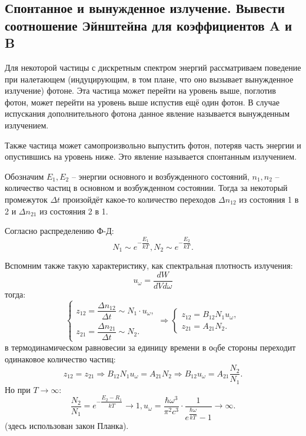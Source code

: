 \subsection{Спонтанное и вынужденное излучение. Вывести соотношение Эйнштейна для
коэффициентов A и B}\label{einstein-a-b}

Для некоторой частицы с дискретным спектром энергий рассматриваем поведение при налетающем
(индуцирующим, в том плане, что оно вызывает вынужденное излучение) фотоне. Эта частица может
перейти на уровень выше, поглотив фотон, может перейти на уровень выше испустив ещё один фотон.
В случае испускания дополнительного фотона данное явление называется вынужденным излучением.

Также частица может самопроизвольно выпустить фотон, потеряв часть энергии и опустившись на
уровень ниже. Это явление называется спонтанным излучением.

Обозначим $E_1, E_2$ -- энергии основного и возбужденного состояний, $n_1, n_2$ -- количество
частиц в основном и возбужденном состоянии. Тогда за некоторый промежуток $\Delta t$ произойдёт
какое-то количество переходов $\Delta n_{12}$ из состояния 1 в 2 и $\Delta n_{21}$ из
состояния 2 в 1.

Согласно распределению Ф-Д:
\[
  N_1 \sim e^{-\dfrac{E_1}{kT}}, N_2 \sim e^{-\dfrac{E_2}{kT}}.
\]

Вспомним также такую характеристику, как спектральная плотность излучения:
\[
  u_\omega = \dfrac{dW}{dV d\omega}
\]
тогда:
\[
  \begin{cases}
    z_{12} = \dfrac{\Delta n_{12}}{\Delta t} \sim N_1 \cdot u_\omega, \\[10pt]
    z_{21} = \dfrac{\Delta n_{21}}{\Delta t} \sim N_2. 
  \end{cases}
  \Rightarrow
  \begin{cases}
    z_{12} = B_{12} N_1 u_\omega, \\
    z_{21} = A_{21} N_2.
  \end{cases}
\]
в термодинамическом равновесии за единицу времени в оqбе стороны переходит одинаковое количество 
частиц:
\[
  z_{12} = z_{21} \Rightarrow
  B_{12} N_1 u_\omega = A_{21} N_2
  \Rightarrow
  B_{12} u_\omega = A_{21} \dfrac{N_2}{N_1}.
\]
Но при $T \to \infty$:
\[
  \dfrac{N_2}{N_1} = e^{- \dfrac{E_2-R_1}{kT}} \to 1,
  u_\omega = \dfrac{\hbar \omega^3}{\pi^2 c^3} \cdot \dfrac{1}{e^{\dfrac{\hbar \omega}{kT}} - 1} \to \infty.
\]
(здесь использован закон Планка).

